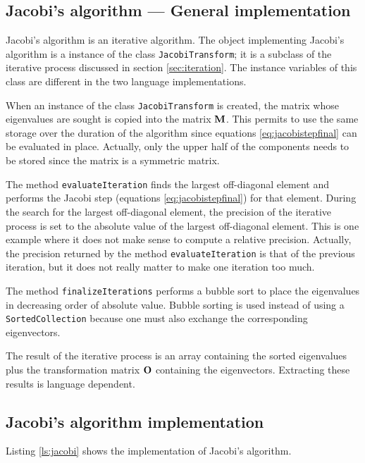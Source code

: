\documentclass[twoside]{book}
\begin{document}
\subsection{Jacobi's algorithm --- General implementation}
Jacobi's algorithm is an iterative
algorithm. The object implementing Jacobi's algorithm is a
instance of the class {\tt JacobiTransform}; it is a subclass of
the iterative process discussed in section \ref{sec:iteration}.
The instance variables of this class are different in the two
language implementations.

When an instance of the class {\tt JacobiTransform} is created,
the matrix whose eigenvalues are sought is copied into the matrix
${\bf M}$. This permits to use the same storage over the duration
of the algorithm since equations \ref{eq:jacobistepfinal} can be
evaluated in place. Actually, only the upper half of the
components needs to be stored since the matrix is a symmetric
matrix.

The method {\tt evaluateIteration} finds the largest off-diagonal
element and performs the Jacobi step (equations
\ref{eq:jacobistepfinal}) for that element. During the search for
the largest off-diagonal element, the precision of the iterative
process is set to the absolute value of the largest off-diagonal
element. This is one example where it does not make sense to
compute a relative precision. Actually, the precision returned by
the method {\tt evaluateIteration} is that of the previous
iteration, but it does not really matter to make one iteration too
much.

The method {\tt finalizeIterations} performs a bubble sort to
place the eigenvalues in decreasing order of absolute value.
Bubble sorting is used instead of using a {\tt SortedCollection}
because one must also exchange the corresponding eigenvectors.

The result of the iterative process is an array containing the
sorted eigenvalues plus the transformation matrix ${\bf O}$
containing the eigenvectors. Extracting these results is language
dependent.

\subsection{Jacobi's algorithm implementation}
Listing \ref{ls:jacobi} shows the implementation of
Jacobi's algorithm.
\end{document}
